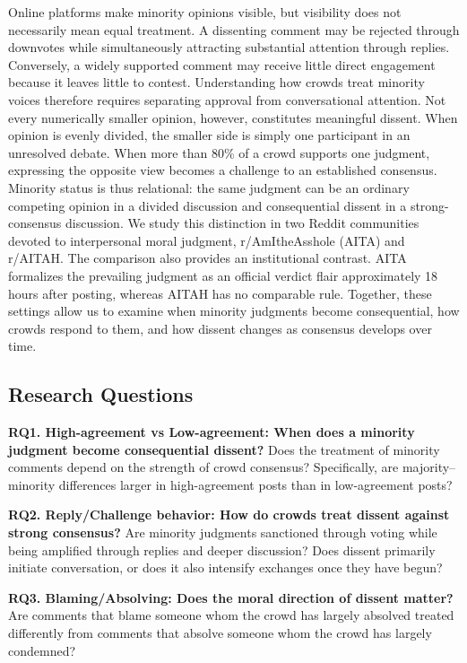 Online platforms make minority opinions visible, but visibility does not necessarily mean equal treatment. A dissenting comment may be rejected through downvotes while simultaneously attracting substantial attention through replies. Conversely, a widely supported comment may receive little direct engagement because it leaves little to contest. Understanding how crowds treat minority voices therefore requires separating approval from conversational attention.
Not every numerically smaller opinion, however, constitutes meaningful dissent. When opinion is evenly divided, the smaller side is simply one participant in an unresolved debate. When more than 80\% of a crowd supports one judgment, expressing the opposite view becomes a challenge to an established consensus. Minority status is thus relational: the same judgment can be an ordinary competing opinion in a divided discussion and consequential dissent in a strong-consensus discussion.
We study this distinction in two Reddit communities devoted to interpersonal moral judgment, r/AmItheAsshole (AITA) and r/AITAH. The comparison also provides an institutional contrast. AITA formalizes the prevailing judgment as an official verdict flair approximately 18 hours after posting, whereas AITAH has no comparable rule. Together, these settings allow us to examine when minority judgments become consequential, how crowds respond to them, and how dissent changes as consensus develops over time.

\subsection{Research Questions}

\textbf{RQ1. High-agreement vs Low-agreement: When does a minority judgment become consequential dissent?}
Does the treatment of minority comments depend on the strength of crowd consensus? Specifically, are majority–minority differences larger in high-agreement posts than in low-agreement posts?

\textbf{RQ2. Reply/Challenge behavior: How do crowds treat dissent against strong consensus?}
Are minority judgments sanctioned through voting while being amplified through replies and deeper discussion? Does dissent primarily initiate conversation, or does it also intensify exchanges once they have begun?

\textbf{RQ3. Blaming/Absolving: Does the moral direction of dissent matter?}
Are comments that blame someone whom the crowd has largely absolved treated differently from comments that absolve someone whom the crowd has largely condemned?


